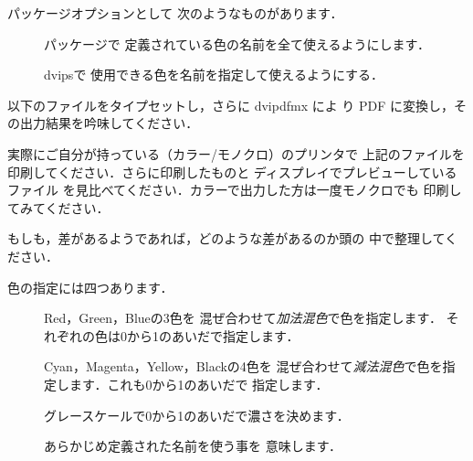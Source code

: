 \begin{intext}
\usepackage[dvipdfmx]{color} 
\end{intext}

パッケージオプションとして
次のようなものがあります．
\begin{description}
 \item[] パッケージで
  定義されている色の名前を全て使えるようにします．
 \item[] {dvips}で
使用できる色を名前を指定して使えるようにする．
\end{description}

以下のファイルをタイプセットし，さらに dvipdfmx によ
り PDF に変換し，その出力結果を吟味してください．



実際にご自分が持っている（カラー/モノクロ）のプリンタで
上記のファイルを印刷してください．さらに印刷したものと
ディスプレイでプレビューしているファイル
を見比べてください．カラーで出力した方は一度モノクロでも
印刷してみてください．

もしも，差があるようであれば，どのような差があるのか頭の
中で整理してください．

色の指定には四つあります．
\begin{description}
 \item[] Red，Green，Blueの3色を
 混ぜ合わせて\emph{加法混色}で色を指定します．
 それぞれの色は0から1のあいだで指定します．
 \item[] Cyan，Magenta，Yellow，Blackの4色を
 混ぜ合わせて\emph{減法混色}で色を指定します．これも0から1のあいだで
 指定します．
 \item[] グレースケールで0から1のあいだで濃さを決めます．
 \item[] あらかじめ定義された名前を使う事を
 意味します．
\end{description}

